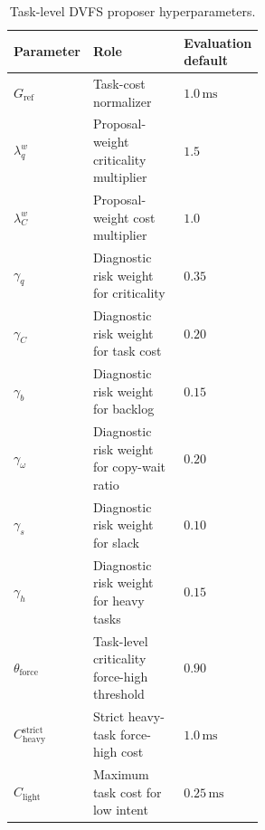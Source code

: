 \begin{table}[t]
\centering
\footnotesize
\begin{tabular}{@{}lp{0.55\linewidth}l@{}}
\toprule
Parameter & Role & Evaluation default \\
\midrule
$G_{\mathrm{ref}}$ & Task-cost normalizer & $1.0\,\mathrm{ms}$ \\
$\lambda_q^{w}$ & Proposal-weight criticality multiplier & $1.5$ \\
$\lambda_C^{w}$ & Proposal-weight cost multiplier & $1.0$ \\
$\gamma_q$ & Diagnostic risk weight for criticality & $0.35$ \\
$\gamma_C$ & Diagnostic risk weight for task cost & $0.20$ \\
$\gamma_b$ & Diagnostic risk weight for backlog & $0.15$ \\
$\gamma_{\omega}$ & Diagnostic risk weight for copy-wait ratio & $0.20$ \\
$\gamma_s$ & Diagnostic risk weight for slack & $0.10$ \\
$\gamma_h$ & Diagnostic risk weight for heavy tasks & $0.15$ \\
$\theta_{\mathrm{force}}$ & Task-level criticality force-high threshold & $0.90$ \\
$C_{\mathrm{heavy}}^{\mathrm{strict}}$ & Strict heavy-task force-high cost & $1.0\,\mathrm{ms}$ \\
$C_{\mathrm{light}}$ & Maximum task cost for low intent & $0.25\,\mathrm{ms}$ \\
\bottomrule
\end{tabular}
\caption{Task-level DVFS proposer hyperparameters.}
\label{tab:dvfs-proposer-hyperparameters}
\end{table}

